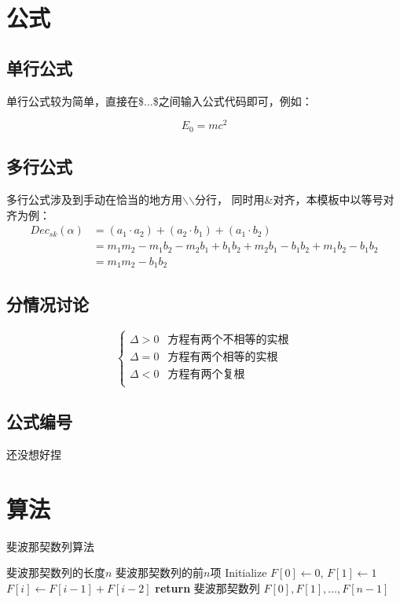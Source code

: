 \documentclass[12pt, a4paper, oneside]{ctexart}
\begin{document}
\newpage

\section{公式}


\subsection{单行公式}
单行公式较为简单，直接在\$...\$之间输入公式代码即可，例如：\par
\begin{equation}
    E_0=mc^2
\end{equation}

\subsection{多行公式}
多行公式涉及到手动在恰当的地方用$\backslash$$\backslash$分行，
同时用\&对齐，本模板中以等号对齐为例：\\
\begin{equation}
    \begin{split}
        Dec_{sk}(\alpha)&=(a_1\cdot a_2)+(a_2\cdot b_1)+(a_1\cdot b_2)\\
        &= m_1m_2-m_1b_2-m_2b_1+b_1b_2+m_2b_1-b_1b_2+m_1b_2-b_1b_2\\
        &= m_1m_2-b_1b_2
    \end{split}
\end{equation}
\subsection{分情况讨论}

$$
    \begin{cases}
        \Delta >0 & \text{方程有两个不相等的实根} \\
        \Delta =0 & \text{方程有两个相等的实根}  \\
        \Delta <0 & \text{方程有两个复根}     \\
    \end{cases}
$$
\subsection{公式编号}
还没想好捏
\newpage
\section{算法}

\begin{algorithm}
    \renewcommand{\algorithmicrequire}{\textbf{Input:}}
    \renewcommand{\algorithmicensure}{\textbf{Output:}}
    \caption{斐波那契数列算法}
    \label{alg:fibonacci}
    \begin{algorithmic}[1]
        \REQUIRE  斐波那契数列的长度$n$
        \ENSURE 斐波那契数列的前$n$项
        \STATE Initialize $F[0] \gets 0$, $F[1] \gets 1$
        \STATE $F[i] \gets F[i-1] + F[i-2]$
        \ENDFOR
        \STATE \textbf{return} 斐波那契数列 $F[0], F[1], \ldots, F[n-1]$
    \end{algorithmic}
\end{algorithm}
\end{document}
